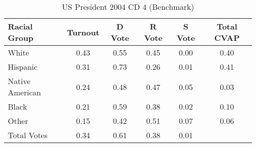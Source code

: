 \begin{table}[htb]
\begin{center}
\caption{US President 2004 CD 4 (Benchmark)}
\label{pres04_cvap_cd_4_benchmark}
\begin{tabular}{lccccc}
  \hline
Racial Group & Turnout & D Vote & R Vote & S Vote & Total CVAP \\ 
  \hline
White & 0.43 & 0.55 & 0.45 & 0.00 & 0.40 \\ 
  Hispanic & 0.31 & 0.73 & 0.26 & 0.01 & 0.41 \\ 
  Native American & 0.24 & 0.48 & 0.47 & 0.05 & 0.03 \\ 
  Black & 0.21 & 0.59 & 0.38 & 0.02 & 0.10 \\ 
  Other & 0.15 & 0.42 & 0.51 & 0.07 & 0.06 \\ 
  Total Votes & 0.34 & 0.61 & 0.38 & 0.01 &  \\ 
   \hline
\end{tabular}
\end{center}
\end{table}
